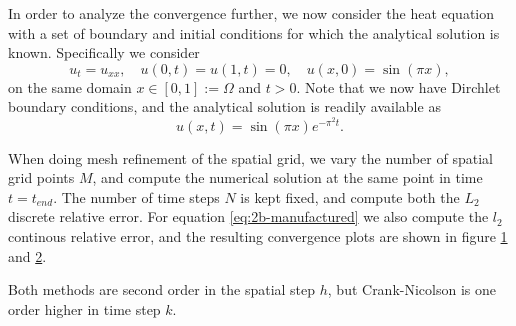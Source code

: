 In order to analyze the convergence further, 
we now consider the heat equation with a set of boundary and initial conditions for which the analytical solution is known. 
Specifically we consider 
\begin{equation}
    u_t = u_{xx}, \quad u(0,t) = u(1,t) = 0, \quad u(x,0) = \sin(\pi x), 
    \label{eq:2b-manufactured}
\end{equation}
on the same domain $x \in [0,1] := \Omega$ and $t > 0$. 
Note that we now have Dirchlet boundary conditions, 
and the analytical solution is readily available as
\begin{equation}
    u(x,t) = \sin(\pi x)  e^{- \pi^2 t}.
\end{equation}

When doing mesh refinement of the spatial grid, 
we vary the number of spatial grid points $M$, 
and compute the numerical solution at the same point in time $t=t_{end}$. 
The number of time steps $N$ is kept fixed, 
and compute both the $L_2$ discrete relative error. 
For equation \eqref{eq:2b-manufactured} we also compute the $l_2$ continous relative error, 
and the resulting convergence plots are shown in figure \ref{fig:2a-convergence} and \ref{fig:2b-convergence}. 

Both methods are second order in the spatial step $h$, 
but Crank-Nicolson is one order higher in time step $k$. 

\begin{figure}[ht]
    \centering
    
    \label{fig:2a-convergence}
\end{figure}

\begin{figure}[ht]
    \centering
    
    \label{fig:2b-convergence}
\end{figure}


%
%    

